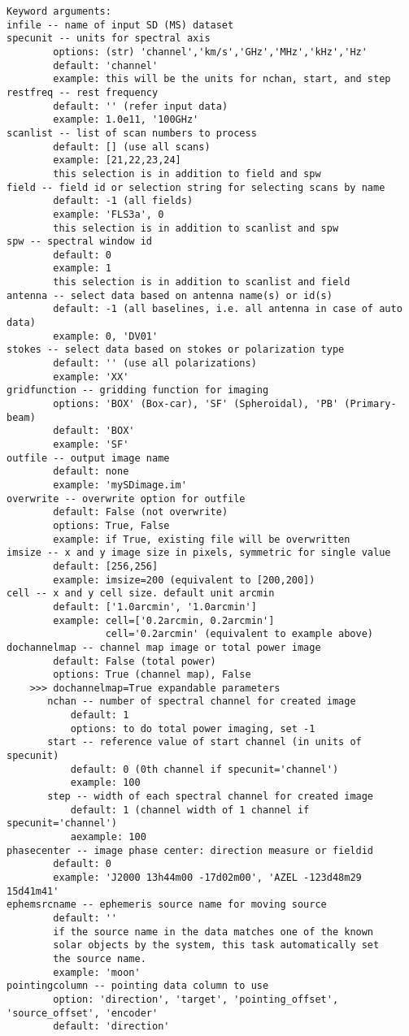 \begin{verbatim}
Keyword arguments:
infile -- name of input SD (MS) dataset
specunit -- units for spectral axis
        options: (str) 'channel','km/s','GHz','MHz','kHz','Hz'
        default: 'channel'
        example: this will be the units for nchan, start, and step
restfreq -- rest frequency
        default: '' (refer input data)
        example: 1.0e11, '100GHz'
scanlist -- list of scan numbers to process
        default: [] (use all scans)
        example: [21,22,23,24]
        this selection is in addition to field and spw
field -- field id or selection string for selecting scans by name
        default: -1 (all fields)
        example: 'FLS3a', 0
        this selection is in addition to scanlist and spw
spw -- spectral window id
        default: 0
        example: 1
        this selection is in addition to scanlist and field
antenna -- select data based on antenna name(s) or id(s)
        default: -1 (all baselines, i.e. all antenna in case of auto data)
        example: 0, 'DV01'
stokes -- select data based on stokes or polarization type 
        default: '' (use all polarizations)
        example: 'XX'
gridfunction -- gridding function for imaging
        options: 'BOX' (Box-car), 'SF' (Spheroidal), 'PB' (Primary-beam)
        default: 'BOX'
        example: 'SF'
outfile -- output image name
        default: none
        example: 'mySDimage.im'
overwrite -- overwrite option for outfile
        default: False (not overwrite)
        options: True, False
        example: if True, existing file will be overwritten
imsize -- x and y image size in pixels, symmetric for single value
        default: [256,256]
        example: imsize=200 (equivalent to [200,200])
cell -- x and y cell size. default unit arcmin
        default: ['1.0arcmin', '1.0arcmin']
        example: cell=['0.2arcmin, 0.2arcmin']
                 cell='0.2arcmin' (equivalent to example above)
dochannelmap -- channel map image or total power image
        default: False (total power)
        options: True (channel map), False
    >>> dochannelmap=True expandable parameters
       nchan -- number of spectral channel for created image
           default: 1 
           options: to do total power imaging, set -1 
       start -- reference value of start channel (in units of specunit)
           default: 0 (0th channel if specunit='channel')
           example: 100
       step -- width of each spectral channel for created image
           default: 1 (channel width of 1 channel if specunit='channel')
           aexample: 100
phasecenter -- image phase center: direction measure or fieldid 
        default: 0
        example: 'J2000 13h44m00 -17d02m00', 'AZEL -123d48m29 15d41m41'
ephemsrcname -- ephemeris source name for moving source
        default: ''
        if the source name in the data matches one of the known 
        solar objects by the system, this task automatically set 
        the source name. 
        example: 'moon' 
pointingcolumn -- pointing data column to use
        option: 'direction', 'target', 'pointing_offset', 'source_offset', 'encoder' 
        default: 'direction'
\end{verbatim}

